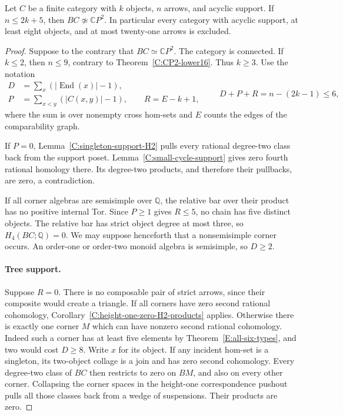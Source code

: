 \begin{theorem}\label{C:acyclic-arrow-excess-six}
Let $C$ be a finite category with $k$ objects, $n$ arrows,
and acyclic support.  If $n\leq2k+5$, then
$BC\not\simeq\mathbb CP^2$.
In particular every category with acyclic support, at
least eight objects, and at most twenty-one arrows is
excluded.
\end{theorem}
\begin{proof}
Suppose to the contrary that $BC\simeq\mathbb CP^2$.
The category is connected.  If $k\leq2$, then $n\leq9$,
contrary to Theorem~\ref{C:CP2-lower16}.  Thus $k\geq3$.
Use the notation
\[
 \begin{split}
 D&=\sum_x(|\operatorname{End}(x)|-1),\\
 P&=\sum_{x<y}(|C(x,y)|-1),\qquad
 R=E-k+1,
 \end{split}
 \qquad D+P+R=n-(2k-1)\leq6,
\]
where the sum is over nonempty cross hom-sets and $E$
counts the edges of the comparability graph.

If $P=0$, Lemma~\ref{C:singleton-support-H2} pulls every
rational degree-two class back from the support poset.
Lemma~\ref{C:small-cycle-support} gives zero fourth
rational homology there.  Its degree-two products, and
therefore their pullbacks, are zero, a contradiction.

If all corner algebras are semisimple over $\mathbb Q$,
the relative bar over their product has no positive
internal Tor.  Since $P\geq1$ gives $R\leq5$, no chain
has five distinct objects.  The relative bar has strict
object degree at most three, so $H_4(BC;\mathbb Q)=0$.
We may suppose henceforth that a nonsemisimple corner
occurs.  An order-one or order-two monoid algebra is
semisimple, so $D\geq2$.

\paragraph{Tree support.}
Suppose $R=0$.  There is no composable pair of strict
arrows, since their composite would create a triangle.
If all corners have zero second rational cohomology,
Corollary~\ref{C:height-one-zero-H2-products} applies.
Otherwise there is exactly one corner $M$ which can have
nonzero second rational cohomology.  Indeed such a corner
has at least five elements by
Theorem~\ref{E:all-six-types}, and two would cost $D\geq8$.
Write $x$ for its object.  If any incident hom-set is a
singleton, its two-object collage is a join and has zero
second cohomology.  Every degree-two class of $BC$ then
restricts to zero on $BM$, and also on every other corner.
Collapsing the corner spaces in the height-one
correspondence pushout pulls all those classes back
from a wedge of suspensions.  Their products are zero.


\end{proof}
